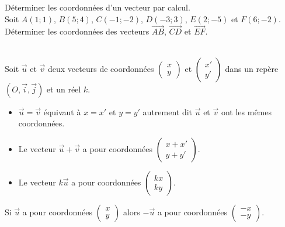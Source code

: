 \begin{Méthode}Déterminer les coordonnées d'un vecteur par calcul. \\
Soit $A(1;1)$, $B(5;4)$, $C(-1;-2)$, $D(-3;3)$, $E(2;-5)$ et $F(6;-2)$.\\
Déterminer les coordonnées des vecteurs $\overrightarrow{AB}$, $\overrightarrow{CD}$ et $\overrightarrow{EF}$.
\vspace{0.2cm}

\ligne

\ligne


\end{Méthode}


\begin{Propriété} $ $ \\
Soit $\overrightarrow{u}$ et $\overrightarrow{v}$ deux vecteurs de coordonnées $\begin{pmatrix} 
x \\
y
 \end{pmatrix}$ et  $\begin{pmatrix} 
x' \\
y'
 \end{pmatrix}$ dans un repère $(O,\overrightarrow{i},\overrightarrow{j})$ et un réel $k$.
\begin{itemize}[label=\textcolor{Couleur2}{$\bullet$}]

 \item $\overrightarrow{u}=\overrightarrow{v}$ équivaut à $x=x'$ et $y=y'$ autrement dit  $\overrightarrow{u}$ et $\overrightarrow{v}$ ont les mêmes coordonnées.
 \item Le vecteur $\overrightarrow{u}+\overrightarrow{v}$ a pour coordonnées $\begin{pmatrix} 
x+x' \\
y+y'
 \end{pmatrix}$.
 \item Le vecteur $k\overrightarrow{u}$ a pour coordonnées $\begin{pmatrix} 
kx \\
ky
 \end{pmatrix}$.
 \end{itemize}

\end{Propriété}


\begin{Remarque}
Si $\overrightarrow{u}$ a pour coordonnées $\begin{pmatrix} 
x \\
y
 \end{pmatrix}$ alors $-\overrightarrow{u}$ a pour coordonnées $\begin{pmatrix} 
-x \\
-y
 \end{pmatrix}$.

\end{Remarque}

